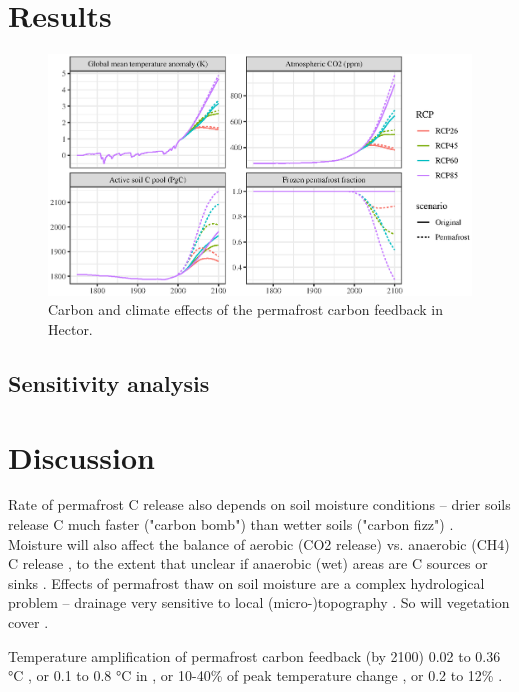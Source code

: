 \documentclass[essd, manuscript]{copernicus}
\begin{document}
\section{Results}

\begin{figure}
    \centering
    \includegraphics[width=\textwidth]{figures/hector_4panel_results.eps}
    \caption{Carbon and climate effects of the permafrost carbon feedback in Hector.}
    \label{fig:4panel}
\end{figure}


\subsection{Sensitivity analysis}

\section{Discussion}
Rate of permafrost C release also depends on soil moisture conditions -- drier soils release C much faster ("carbon bomb") than wetter soils ("carbon fizz") \citep{elberling_2013_long-term}.
Moisture will also affect the balance of aerobic (CO2 release) vs. anaerobic (CH4) C release \citep{turetsky_2002_boreal}, to the extent that unclear if anaerobic (wet) areas are C sources or sinks \citep{wickland_2006_effects}.
Effects of permafrost thaw on soil moisture are a complex hydrological problem -- drainage very sensitive to local (micro-)topography \citep{wickland_2006_effects}.
So will vegetation cover \citep{wickland_2006_effects}.

Temperature amplification of permafrost carbon feedback (by 2100) 0.02 to 0.36 °C \citep{burke_2013_estimating, schneider-von-deimling_2012_estimating, schneider-von-deimling_2015_observation-based}, or 0.1 to 0.8 °C in \citep{macdougall_2012_significant, macdougall_2013_if}, or 10-40\% of peak temperature change \citep{crichton_2016_permafrost}, or 0.2 to 12\% \citep{burke_2017_quantifying}.
\end{document}
